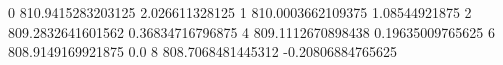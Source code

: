 0 810.9415283203125 2.026611328125
1 810.0003662109375 1.08544921875
2 809.2832641601562 0.36834716796875
4 809.1112670898438 0.19635009765625
6 808.9149169921875 0.0
8 808.7068481445312 -0.20806884765625
